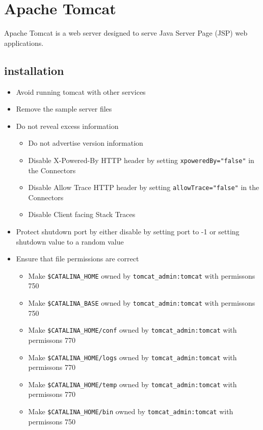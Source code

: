 \section{Apache Tomcat}

Apache Tomcat is a web server designed to serve Java Server Page (JSP) web applications.

\subsection{installation}

\begin{itemize}
	\item Avoid running tomcat with other services
	\item Remove the sample server files
	\item Do not reveal excess information
		\begin{itemize}
		\item Do not advertise version information
		\item Disable X-Powered-By HTTP header by setting \lstinline|xpoweredBy="false"| in the Connectors
		\item Disable Allow Trace HTTP header by setting \lstinline|allowTrace="false"| in the Connectors
		\item Disable Client facing Stack Traces
		\end{itemize}
	\item Protect shutdown port by either disable by setting port to -1 or setting shutdown value to a random value
	\item Ensure that file permissions are correct
		\begin{itemize}
		\item Make \lstinline|$CATALINA_HOME| owned by \lstinline|tomcat_admin:tomcat| with permissons 750
		\item Make \lstinline|$CATALINA_BASE| owned by \lstinline|tomcat_admin:tomcat| with permissons 750
		\item Make \lstinline|$CATALINA_HOME/conf| owned by \lstinline|tomcat_admin:tomcat| with permissons 770
		\item Make \lstinline|$CATALINA_HOME/logs| owned by \lstinline|tomcat_admin:tomcat| with permissons 770
		\item Make \lstinline|$CATALINA_HOME/temp| owned by \lstinline|tomcat_admin:tomcat| with permissons 770
		\item Make \lstinline|$CATALINA_HOME/bin| owned by \lstinline|tomcat_admin:tomcat| with permissons 750

\end{itemize}
\end{itemize}
